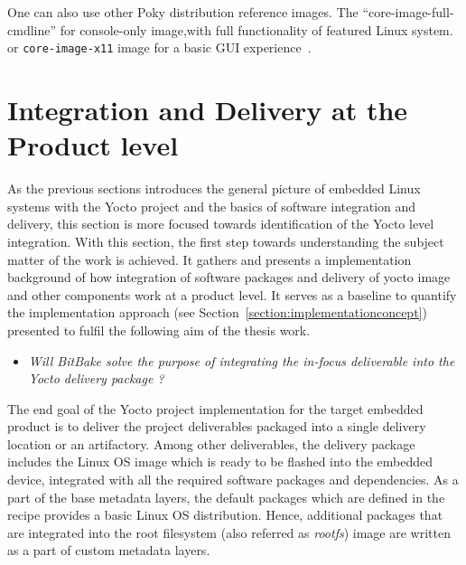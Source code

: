 One can also use other Poky distribution reference images. The “core-image-full-cmdline” for console-only image,with full functionality of featured Linux system. or \texttt{core-image-x11} image for a basic \ac{GUI} experience~\parencite{veromannembedded}. 



\section{Integration and  Delivery at the Product level}\label{section:SoftwareIntegrationDeliveryProductLevel}

As the previous sections introduces the general picture of embedded Linux systems with the Yocto project and the basics of software integration and delivery, this section is more focused towards identification of the Yocto level integration. With this section, the first step towards understanding the subject matter of the work is achieved. It gathers and presents a implementation background of how integration of software packages and delivery of yocto image and other components work at a product level. It serves as a baseline to quantify the implementation approach (see Section~\ref{section:implementationconcept}) presented to fulfil the following aim of the thesis work. 

\vspace{0.2cm}
\begin{itemize}
\item \emph{Will BitBake solve the purpose of integrating the in-focus deliverable into the Yocto delivery package ?} 
\end{itemize}
\vspace{0.2cm}


\noindent The end goal of the Yocto project implementation for the target embedded product is to deliver the project deliverables packaged into a single delivery location or an artifactory. Among other deliverables, the delivery package includes the Linux \ac{OS} image which is ready to be flashed into the embedded device, integrated with all the required software packages and dependencies. As a part  of the base metadata layers, the default packages which are defined in the recipe provides a basic Linux OS distribution. Hence, additional packages that are integrated into the root filesystem (also referred as \emph{rootfs}) image are written as a part of custom metadata layers. 


